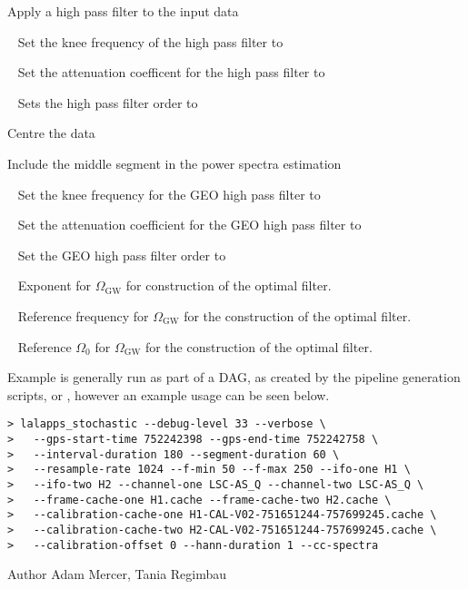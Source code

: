 \begin{entry}
\begin{entry}
\item[\option{--high-pass-filter}]
Apply a high pass filter to the input data

\item[\option{--hpf-frequency}~\parm{N}]
Set the knee frequency of the high pass filter to 

\item[\option{--hpf-attenuation}~\parm{N}]
Set the attenuation coefficent for the high pass filter to 

\item[\option{--hpf-order}~\parm{N}]
Sets the high pass filter order to 

\item[\option{--recentre}]
Centre the data

\item[\option{--middle-segment}]
Include the middle segment in the power spectra estimation

\item[\option{--geo-hpf-frequency}~\parm{N}]
Set the knee frequency for the GEO high pass filter to 

\item[\option{--geo-hpf-attenuation}~\parm{N}]
Set the attenuation coefficient for the GEO high pass filter to 

\item[\option{--geo-hpf-order}~\parm{N}]
Set the GEO high pass filter order to 

\item[\option{--alpha}~\parm{N}]
Exponent for $\Omega_{\mathrm{GW}}$ for construction of the optimal
filter.

\item[\option{--f-ref}~\parm{N}]
Reference frequency for $\Omega_{\mathrm{GW}}$ for the construction of
the optimal filter.

\item[\option{--omega0}~\parm{N}]
Reference $\Omega_0$ for $\Omega_{\mathrm{GW}}$ for the construction of
the optimal filter.
\end{entry}

\item[Example]
 is generally run as part of a DAG, as created
by the pipeline generation scripts,  or
, however an example usage can be seen
below.

\begin{verbatim}
> lalapps_stochastic --debug-level 33 --verbose \
>   --gps-start-time 752242398 --gps-end-time 752242758 \
>   --interval-duration 180 --segment-duration 60 \
>   --resample-rate 1024 --f-min 50 --f-max 250 --ifo-one H1 \
>   --ifo-two H2 --channel-one LSC-AS_Q --channel-two LSC-AS_Q \
>   --frame-cache-one H1.cache --frame-cache-two H2.cache \
>   --calibration-cache-one H1-CAL-V02-751651244-757699245.cache \
>   --calibration-cache-two H2-CAL-V02-751651244-757699245.cache \
>   --calibration-offset 0 --hann-duration 1 --cc-spectra
\end{verbatim}

\item[Author] 
Adam Mercer, Tania Regimbau
\end{entry}
